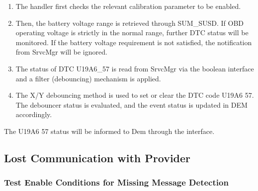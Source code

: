 \begin{enumerate}
    \item The handler first checks the relevant calibration parameter  to be enabled.
    \item Then, the battery voltage range is retrieved through SUM_SUSD. If OBD operating voltage is strictly in the normal range, further DTC status will be monitored. If the battery voltage requirement is not satisfied, the notification from SrvcMgr will be ignored.
    \item The status of DTC U19A6_57 is read from SrvcMgr via the boolean interface  and a filter (debouncing) mechanism is applied.
    \item The X/Y debouncing method is used to set or clear the DTC code U19A6 57. The debouncer status is evaluated, and the event status is updated in DEM accordingly.
\end{enumerate}

The U19A6 57 status will be informed to Dem through the  interface.

{}


\subsection{Lost Communication with Provider}
\label{subsec:LostCommunicationWithProvider}
\subsubsection{Test Enable Conditions for Missing Message Detection}

